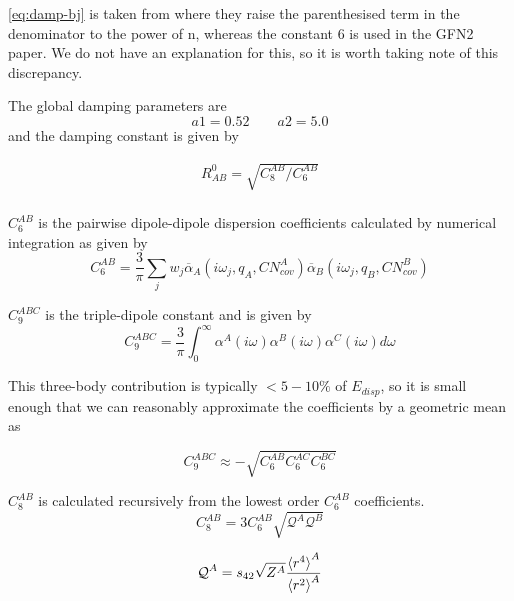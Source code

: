 \autoref{eq:damp-bj} is taken from \cite{bannwarth2021} where they raise the parenthesised term in the denominator to the power of n, whereas the constant 6 is used in the GFN2 paper\cite{bannwarth2019}. We do not have an explanation for this, so it is worth taking note of this discrepancy.


The global damping parameters are
\[
  a1 = 0.52 \quad\quad a2 = 5.0
\]
and the damping constant is given by

\begin{equation}
\begin{split}
        R_{AB}^0 = \sqrt{C_8^{AB} / C_6^{AB}}\\
\end{split}
\end{equation}



\(C_6^{AB}\) is the pairwise dipole-dipole dispersion coefficients calculated by numerical integration as given by
\begin{equation}
  C_6^{AB} = \frac{3}{\pi} \sum_{j} w_j \overline{\alpha}_A (i\omega_j, q_A, CN_{cov}^A)\overline{\alpha}_B (i\omega_j, q_B, CN_{cov}^B)
\end{equation}



\(C_9^{ABC}\) is the triple-dipole constant and is given by
\begin{equation}
  C_9^{ABC} = \frac{3}{\pi} \int_0^\infty \alpha^A(i\omega) \alpha^B(i\omega)\alpha^C(i\omega)d\omega
\end{equation}

This three-body contribution is typically \(<5-10\%\) of \(E_{disp}\), so it is small enough that we can reasonably approximate the coefficients by a geometric mean as\cite{grimme2010}


\begin{equation}
  C_9^{ABC} \approx -\sqrt{C_6^{AB} C_6^{AC} C_6^{BC}}
\end{equation}



\(C_8^{AB}\) is calculated recursively from the lowest order \(C_6^{AB}\) coefficients.
\begin{equation}
  C_8^{AB} = 3C_6^{AB} \sqrt{\mathcal{Q}^A\mathcal{Q}^B}
\end{equation}

\begin{equation}
  \mathcal{Q}^A = s_{42} \sqrt{Z^A} \frac{\braket{r^4}^A}{\braket{r^2}^A}
\end{equation}

